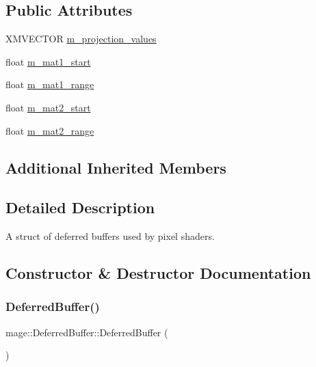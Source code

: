 \subsection*{Public Attributes}
\begin{DoxyCompactItemize}
\item 
X\+M\+V\+E\+C\+T\+OR \hyperlink{structmage_1_1_deferred_buffer_a7af6a3b361e4cfa5c29349b4a6b2823b}{m\+\_\+projection\+\_\+values}
\item 
float \hyperlink{structmage_1_1_deferred_buffer_a816bdbe74ebf1f923e9b035f995c3373}{m\+\_\+mat1\+\_\+start}
\item 
float \hyperlink{structmage_1_1_deferred_buffer_a7dadbbdc33346d53bbfec7ebdbd06064}{m\+\_\+mat1\+\_\+range}
\item 
float \hyperlink{structmage_1_1_deferred_buffer_a04dc925c3f765d7ca2ed747dd180c438}{m\+\_\+mat2\+\_\+start}
\item 
float \hyperlink{structmage_1_1_deferred_buffer_ac0834abb80ac742f94d207bab570fcd9}{m\+\_\+mat2\+\_\+range}
\end{DoxyCompactItemize}
\subsection*{Additional Inherited Members}


\subsection{Detailed Description}
A struct of deferred buffers used by pixel shaders. 

\subsection{Constructor \& Destructor Documentation}
\hypertarget{structmage_1_1_deferred_buffer_a98f0859ebb636565f313078bb16bcc83}{}\label{structmage_1_1_deferred_buffer_a98f0859ebb636565f313078bb16bcc83} 
\subsubsection{\texorpdfstring{Deferred\+Buffer()}{DeferredBuffer()}\hspace{0.1cm}{\footnotesize\ttfamily [1/3]}}
{\footnotesize\ttfamily mage\+::\+Deferred\+Buffer\+::\+Deferred\+Buffer (\begin{DoxyParamCaption}{ }\end{DoxyParamCaption})}

